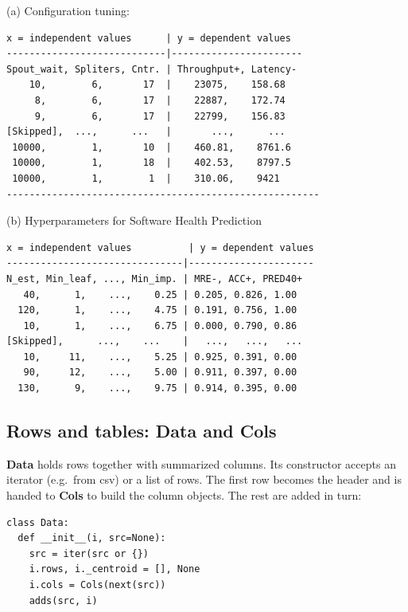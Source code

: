 \documentclass[AMA,STIX2COL]{WileyNJDv5}
\newcommand{\cls}[1]{%
  \setlength{\fboxsep}{1.5pt}%
  \colorbox{clsbg}{\sffamily\bfseries{#1}}%
}
\begin{document}
{\begin{table}[!b]
\caption{An example MOOT data set: configuration tuning for a
distributed stream-processing system. Numeric column names
start with an upper-case letter. Goal column names end with
``+'' (maximize) or ``-'' (minimize). Everything else is an
independent attribute.}
\label{moot}
\begin{center}
\begin{minipage}{3in}
\normalsize{(a) Configuration tuning:}
{\fontsize{6pt}{7.2pt}\selectfont
\begin{verbatim}
x = independent values      | y = dependent values
----------------------------|-----------------------
Spout_wait, Spliters, Cntr. | Throughput+, Latency-
    10,        6,       17  |    23075,    158.68
     8,        6,       17  |    22887,    172.74
     9,        6,       17  |    22799,    156.83
[Skipped],  ...,      ...   |       ...,      ...
 10000,        1,       10  |    460.81,    8761.6
 10000,        1,       18  |    402.53,    8797.5
 10000,        1,        1  |    310.06,    9421
-------------------------------------------------------
\end{verbatim}}
\normalsize{(b) Hyperparameters for Software Health Prediction}
{\fontsize{6pt}{7.2pt}\selectfont
\begin{verbatim}
x = independent values          | y = dependent values
-------------------------------|----------------------
N_est, Min_leaf, ..., Min_imp. | MRE-, ACC+, PRED40+
   40,      1,    ...,    0.25 | 0.205, 0.826, 1.00
  120,      1,    ...,    4.75 | 0.191, 0.756, 1.00
   10,      1,    ...,    6.75 | 0.000, 0.790, 0.86
[Skipped],      ...,    ...    |   ...,   ...,   ...
   10,     11,    ...,    5.25 | 0.925, 0.391, 0.00
   90,     12,    ...,    5.00 | 0.911, 0.397, 0.00
  130,      9,    ...,    9.75 | 0.914, 0.395, 0.00
\end{verbatim}}
\end{minipage}
\end{center}
\end{table}

\subsection{Rows and tables: \cls{Data} and \cls{Cols}}

\cls{Data} holds rows together with summarized columns. Its
constructor accepts an iterator (e.g.\ from \textsf{csv}) or a
list of rows. The first row becomes the header and is handed
to \cls{Cols} to build the column objects. The rest are added
in turn:
\begin{verbatim}
class Data:
  def __init__(i, src=None):
    src = iter(src or {})
    i.rows, i._centroid = [], None
    i.cols = Cols(next(src))
    adds(src, i)


\end{verbatim}}
\end{document}
